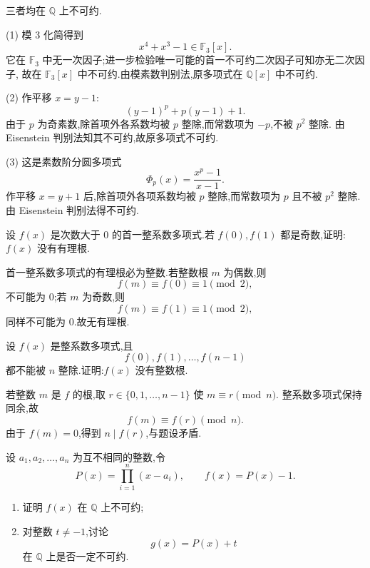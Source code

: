 \begin{solution}
三者均在 $\mathbb{Q}$ 上不可约.

(1) 模 $3$ 化简得到
\[
  x^4+x^3-1\in\mathbb{F}_3[x].
\]
它在 $\mathbb{F}_3$ 中无一次因子;进一步检验唯一可能的首一不可约二次因子可知亦无二次因子,
故在 $\mathbb{F}_3[x]$ 中不可约.由模素数判别法,原多项式在 $\mathbb{Q}[x]$ 中不可约.

(2) 作平移 $x=y-1$:
\[
  (y-1)^p+p(y-1)+1.
\]
由于 $p$ 为奇素数,除首项外各系数均被 $p$ 整除,而常数项为 $-p$,不被 $p^2$ 整除.
由 Eisenstein 判别法知其不可约,故原多项式不可约.

(3) 这是素数阶分圆多项式
\[
  \Phi_p(x)=\dfrac{x^p-1}{x-1}.
\]
作平移 $x=y+1$ 后,除首项外各项系数均被 $p$ 整除,而常数项为 $p$ 且不被 $p^2$ 整除.
由 Eisenstein 判别法得不可约.
\end{solution}

\begin{example}
设 $f(x)$ 是次数大于 $0$ 的首一整系数多项式.若 $f(0),f(1)$ 都是奇数,证明:$f(x)$ 没有有理根.
\end{example}
\exampleblank

\begin{solution}
首一整系数多项式的有理根必为整数.若整数根 $m$ 为偶数,则
\[
  f(m)\equiv f(0)\equiv1\pmod2,
\]
不可能为 $0$;若 $m$ 为奇数,则
\[
  f(m)\equiv f(1)\equiv1\pmod2,
\]
同样不可能为 $0$.故无有理根.
\end{solution}

\begin{example}[\markstar]
设 $f(x)$ 是整系数多项式,且
\[
  f(0),f(1),\ldots,f(n-1)
\]
都不能被 $n$ 整除.证明:$f(x)$ 没有整数根.
\end{example}
\exampleblank

\begin{solution}
若整数 $m$ 是 $f$ 的根,取 $r\in\{0,1,\ldots,n-1\}$ 使 $m\equiv r\pmod n$.
整系数多项式保持同余,故
\[
  f(m)\equiv f(r)\pmod n.
\]
由于 $f(m)=0$,得到 $n\mid f(r)$,与题设矛盾.
\end{solution}

\begin{example}
设 $a_1,a_2,\ldots,a_n$ 为互不相同的整数,令
\[
  P(x)=\prod\limits_{i=1}^{n}(x-a_i),
  \qquad
  f(x)=P(x)-1.
\]
\begin{enumerate}
  \item 证明 $f(x)$ 在 $\mathbb{Q}$ 上不可约;
  \item 对整数 $t\ne-1$,讨论
  \[
    g(x)=P(x)+t
  \]
  在 $\mathbb{Q}$ 上是否一定不可约.
\end{enumerate}
\end{example}
\exampleblank

